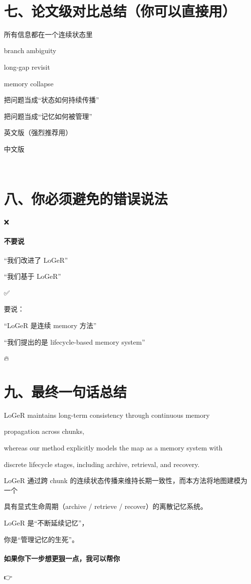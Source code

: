 \documentclass[12pt]{article}
\begin{document}
🎯

\section{七、论文级对比总结（你可以直接用）}
所有信息都在⼀个连续状态⾥

branch ambiguity

long-gap revisit

memory collapse

把问题当成“状态如何持续传播”

把问题当成“记忆如何被管理”

英文版（强烈推荐用）

中文版

🚨

\section{八、你必须避免的错误说法}
❌

\paragraph{不要说}
“我们改进了 LoGeR”

“我们基于 LoGeR”

✅

要说：

“LoGeR 是连续 memory 方法”

“我们提出的是 lifecycle-based memory system”

🔥

\section{九、最终一句话总结}
LoGeR maintains long-term consistency through continuous memory

propagation across chunks,

whereas our method explicitly models the map as a memory system with

discrete lifecycle stages, including archive, retrieval, and recovery.

LoGeR 通过跨 chunk 的连续状态传播来维持长期一致性，而本方法将地图建模为一个

具有显式生命周期（archive / retrieve / recover）的离散记忆系统。

LoGeR 是“不断延续记忆”，

你是“管理记忆的生死”。

\paragraph{如果你下一步想更狠一点，我可以帮你}
👉
\end{document}
